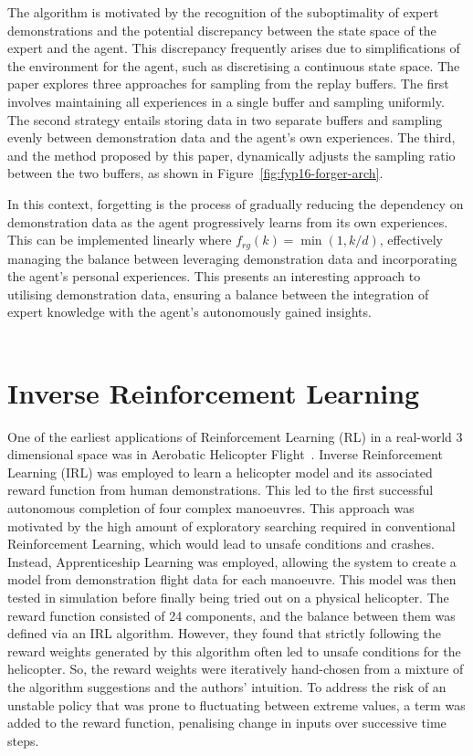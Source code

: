 The algorithm is motivated by the recognition of the suboptimality of expert demonstrations and the potential discrepancy between the state space of the expert and the agent.
This discrepancy frequently arises due to simplifications of the environment for the agent, such as discretising a continuous state space.
The paper explores three approaches for sampling from the replay buffers.
The first involves maintaining all experiences in a single buffer and sampling uniformly.
The second strategy entails storing data in two separate buffers and sampling evenly between demonstration data and the agent's own experiences.
The third, and the method proposed by this paper, dynamically adjusts the sampling ratio between the two buffers, as shown in Figure~\ref{fig:fyp16-forger-arch}.

In this context, forgetting is the process of gradually reducing the dependency on demonstration data as the agent progressively learns from its own experiences.
This can be implemented linearly where $f_{rg}(k) = \min(1, k/d)$, effectively managing the balance between leveraging demonstration data and incorporating the agent's personal experiences.
This presents an interesting approach to utilising demonstration data, ensuring a balance between the integration of expert knowledge with the agent's autonomously gained insights. \\\\

\section{Inverse Reinforcement Learning}
One of the earliest applications of Reinforcement Learning (RL) in a real-world 3 dimensional space was in Aerobatic Helicopter Flight~\cite{abbeelRLAerobaticFlight}.
Inverse Reinforcement Learning (IRL) was employed to learn a helicopter model and its associated reward function from human demonstrations.
This led to the first successful autonomous completion of four complex manoeuvres.
This approach was motivated by the high amount of exploratory searching required in conventional Reinforcement Learning, which would lead to unsafe conditions and crashes.
Instead, Apprenticeship Learning was employed, allowing the system to create a model from demonstration flight data for each manoeuvre.
This model was then tested in simulation before finally being tried out on a physical helicopter.
The reward function consisted of 24 components, and the balance between them was defined via an IRL algorithm.
However, they found that strictly following the reward weights generated by this algorithm often led to unsafe conditions for the helicopter.
So, the reward weights were iteratively hand-chosen from a mixture of the algorithm suggestions and the authors' intuition. 
To address the risk of an unstable policy that was prone to fluctuating between extreme values, a term was added to the reward function, penalising change in inputs over successive time steps.

